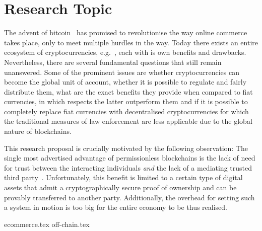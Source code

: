 \section{Research Topic}
  The advent of bitcoin~\cite{bitcoin} has promised to revolutionise the way online
  commerce takes place, only to meet multiple hurdles in the way. Today there exists an
  entire ecosystem of cryptocurrencies, e.g.~\cite{ethereum,zcash,ouroboros}, each with is
  own benefits and drawbacks. Nevertheless, there are several fundamental questions that
  still remain unanswered. Some of the prominent issues are whether cryptocurrencies can
  become the global unit of account, whether it is possible to regulate and fairly
  distribute them, what are the exact benefits they provide when compared to fiat
  currencies, in which respects the latter outperform them and if it is possible to
  completely replace fiat currencies with decentralised cryptocurrencies for which the
  traditional measures of law enforcement are less applicable due to the global nature of
  blockchains.

  This research proposal is crucially motivated by the following observation: The single
  most advertised advantage of permissionless blockchains is the lack of need for trust
  between the interacting individuals \textit{and} the lack of a mediating trusted third
  party~\cite{bitcoin}. Unfortunately, this benefit is limited to a certain type of
  digital assets that admit a cryptographically secure proof of ownership and can be
  provably transferred to another party. Additionally, the overhead for setting such a
  system in motion is too big for the entire economy to be thus realised.

  {ecommerce.tex}
  {off-chain.tex}
